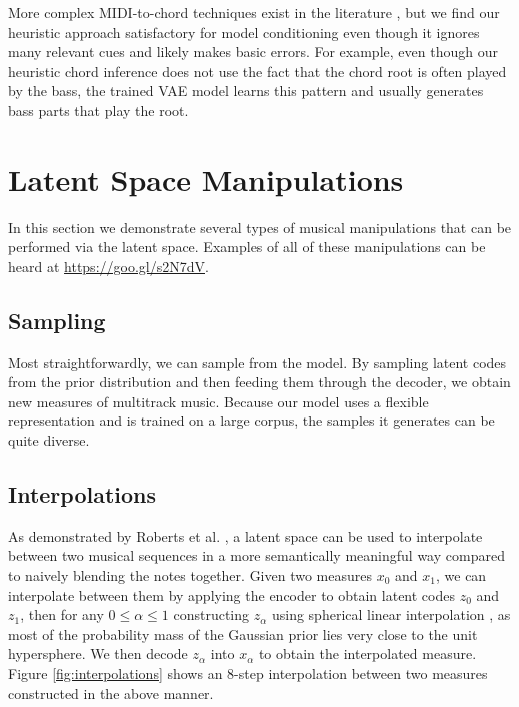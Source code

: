 \documentclass{article}
\begin{document}
More complex MIDI-to-chord techniques exist in the literature \cite{scholz2008cochonut, wang2012musical, DBLP:conf/ismir/MasadaB17}, but we find our heuristic approach satisfactory for model conditioning even though it ignores many relevant cues and likely makes basic errors.  For example, even though our heuristic chord inference does not use the fact that the chord root is often played by the bass, the trained VAE model learns this pattern and usually generates bass parts that play the root.


\section{Latent Space Manipulations}

In this section we demonstrate several types of musical manipulations that can be performed via the latent space.  Examples of all of these manipulations can be heard at \url{https://goo.gl/s2N7dV}.

\subsection{Sampling}
Most straightforwardly, we can sample from the model.  By sampling latent codes from the prior distribution and then feeding them through the decoder, we obtain new measures of multitrack music.  Because our model uses a flexible representation and is trained on a large corpus, the samples it generates can be quite diverse.

\subsection{Interpolations}

As demonstrated by Roberts et al. \cite{roberts2018hierarchical}, a latent space can be used to interpolate between two musical sequences in a more semantically meaningful way compared to naively blending the notes together. Given two measures $x_0$ and $x_1$, we can interpolate between them by applying the encoder to obtain latent codes $z_0$ and $z_1$, then for any \mbox{$0 \leq \alpha \leq 1$} constructing $z_\alpha$ using spherical linear interpolation \cite{white2016sampling}, as most of the probability mass of the Gaussian prior lies very close to the unit hypersphere.  We then decode $z_\alpha$ into $x_\alpha$ to obtain the interpolated measure.  Figure \ref{fig:interpolations} shows an 8-step interpolation between two measures constructed in the above manner.
\end{document}
